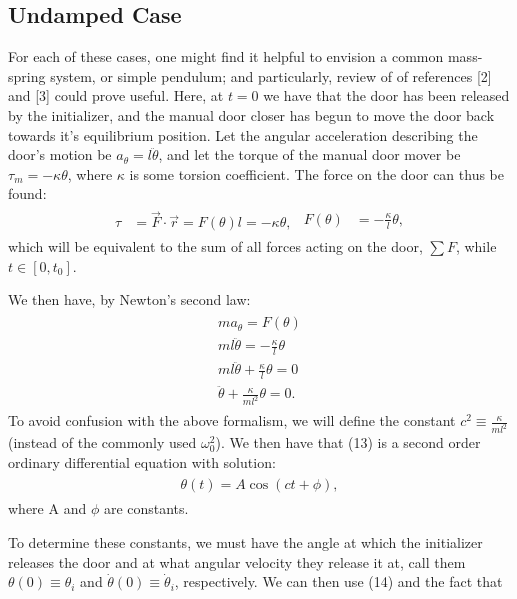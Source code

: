     \subsection{Undamped Case}
    For each of these cases, one might find it helpful to envision a common mass-spring system, or simple pendulum; and particularly, review of of references [2] and [3] could prove useful. Here, at $t=0$ we have that the door has been released by the initializer, and the manual door closer has begun to move the door back towards it's equilibrium position. Let the angular acceleration describing the door's motion be $a_{\theta}=l\ddot\theta$, and let the torque of the manual door mover be $\tau_{m}=-\kappa\theta$, where $\kappa$ is some torsion coefficient. The force on the door can thus be found:
    \begin{eqnarray}
    \begin{split}
        \tau & = \vec F \cdot \vec r = F(\theta)l = -\kappa \theta,
    \end{split}
    \begin{split}
        F(\theta) & = -\frac{\kappa}{l}\theta,
    \end{split}
    \end{eqnarray}
    which will be equivalent to the sum of all forces acting on the door, $\sum F$, while $t\in[0,t_{0}]$.\par
    We then have, by Newton's second law:
    \begin{eqnarray}
    \begin{split}
        ma_{\theta}=F(\theta)\\
        ml\ddot\theta = -\frac{\kappa}{l}\theta\\
        ml\ddot\theta+\frac{\kappa}{l}\theta=0\\
        \ddot\theta + \frac{\kappa}{ml^{2}}\theta=0.
    \end{split}
    \end{eqnarray}
    To avoid confusion with the above formalism, we will define the constant $c^{2}\equiv\frac{\kappa}{ml^{2}}$ (instead of the commonly used $\omega_{0}^{2}$). We then have that (13) is a second order ordinary differential equation with solution:
    \begin{eqnarray}
    \begin{split}
        \theta(t)=A\cos(ct+\phi),
    \end{split}
    \end{eqnarray}
    where A and $\phi$ are constants.\par
    To determine these constants, we must have the angle at which the initializer releases the door and at what angular velocity they release it at, call them $\theta(0)\equiv\theta_{i}$ and $\dot\theta(0)\equiv\dot\theta_{i}$, respectively. We can then use (14) and the fact that
